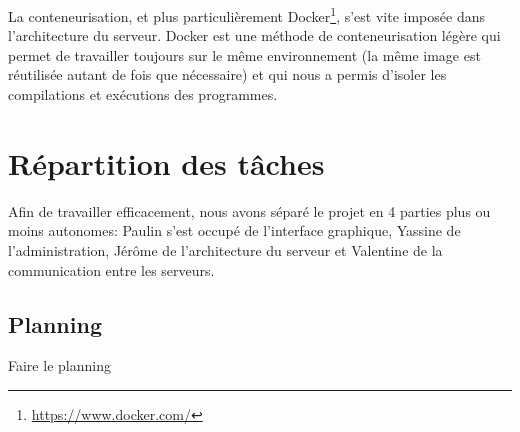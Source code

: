 \par La conteneurisation, et plus particulièrement Docker\footnote{\url{https://www.docker.com/}}, s'est vite imposée dans l'architecture du serveur. Docker est une méthode de conteneurisation légère qui permet de travailler toujours sur le même environnement (la même image est réutilisée autant de fois que nécessaire) et qui nous a permis d'isoler les compilations et exécutions des programmes.

\section{Répartition des tâches}

\par Afin de travailler efficacement, nous avons séparé le projet en 4 parties plus ou moins autonomes: Paulin s'est occupé de l'interface graphique, Yassine de l'administration, Jérôme de l'architecture du serveur et Valentine de la communication entre les serveurs.

\subsection{Planning}

Faire le planning
